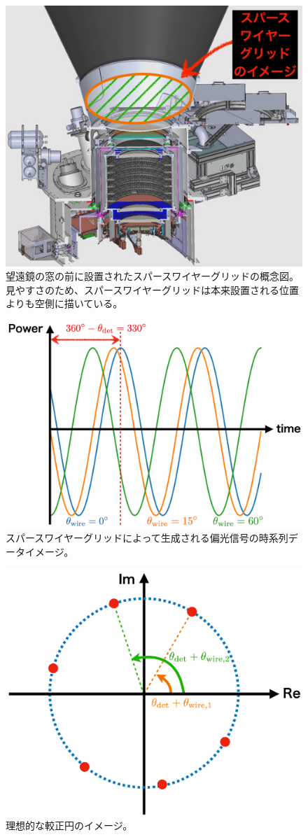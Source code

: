\documentclass[../../main.tex]{subfiles}
\begin{document}
\begin{figure}[H]
    \centering
    \includegraphics[width=0.75\columnwidth]{wiregrid/wiregrid_telescope_image.pdf}
    \caption{望遠鏡の窓の前に設置されたスパースワイヤーグリッドの概念図。
    見やすさのため、スパースワイヤーグリッドは本来設置される位置よりも空側に描いている。
    }
    \label{fig:wiregrid_telescope}
\end{figure}
\begin{figure}[H]
    \centering
    \includegraphics[width=0.7\columnwidth]{wiregrid/wiregrid_tod.pdf}
    \caption[スパースワイヤーグリッドによって生成される偏光信号の時系列データイメージ]{スパースワイヤーグリッドによって生成される偏光信号の時系列データイメージ。}
    \label{fig:wiregrid_mod}
\end{figure}
\begin{figure}[H]
    \centering
    \includegraphics[width=0.6\columnwidth]{wiregrid/wiregrid_calibration_circle.pdf}
    \caption{理想的な較正円のイメージ。}
    \label{fig:calibration_circle}
\end{figure}
\end{document}
